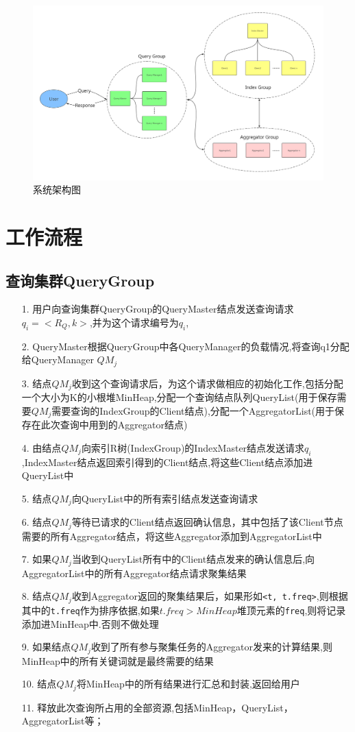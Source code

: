 \documentclass{elegantpaper}
\begin{document}
\begin{figure}[htbp]
    \centering
    \includegraphics[width=1\textwidth]{figure/architecture.png}
    \caption{系统架构图}
\end{figure}

\section{工作流程}
\subsection{查询集群QueryGroup}
\begin{itemize}
    \item[1.] 用户向查询集群QueryGroup的QueryMaster结点发送查询请求$q_i=<R_Q,k>$,并为这个请求编号为$q_i$,
    \item[2.] QueryMaster根据QueryGroup中各QueryManager的负载情况,将查询q1分配给QueryManager $QM_j$
    \item[3.] 结点$QM_j$收到这个查询请求后，为这个请求做相应的初始化工作,包括分配一个大小为K的小根堆MinHeap,分配一个查询结点队列QueryList(用于保存需要$QM_j$需要查询的IndexGroup的Client结点),分配一个AggregatorList(用于保存在此次查询中用到的Aggregator结点)
    \item[4.] 由结点$QM_j$向索引R树(IndexGroup)的IndexMaster结点发送请求$q_i$,IndexMaster结点返回索引得到的Client结点,将这些Client结点添加进QueryList中
    \item[5.] 结点$QM_j$向QueryList中的所有索引结点发送查询请求
    \item[6.] 结点$QM_j$等待已请求的Client结点返回确认信息，其中包括了该Client节点需要的所有Aggregator结点，将这些Aggregator添加到AggregatorList中
    \item[7.] 如果$QM_j$当收到QueryList所有中的Client结点发来的确认信息后,向AggregatorList中的所有Aggregator结点请求聚集结果
    \item[8.] 结点$QM_j$收到Aggregator返回的聚集结果后，如果形如\verb|<t, t.freq>|,则根据其中的\verb|t.freq|作为排序依据,如果$t.freq > MinHeap$堆顶元素的\verb|freq|,则将记录添加进MinHeap中.否则不做处理
    \item[9.] 如果结点$QM_j$收到了所有参与聚集任务的Aggregator发来的计算结果,则MinHeap中的所有关键词就是最终需要的结果
    \item[10.] 结点$QM_j$将MinHeap中的所有结果进行汇总和封装,返回给用户
    \item[11.] 释放此次查询所占用的全部资源,包括MinHeap，QueryList，AggregatorList等；
\end{itemize}
\end{document}
